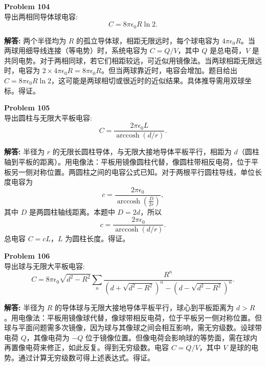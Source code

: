 \documentclass[12pt, a4paper, oneside]{ctexart}
\newenvironment{solution}{\par\noindent\textbf{解答:}\quad}{\par}
\begin{document}
\begin{mdframed}[backgroundcolor=gray!10, linewidth=0pt]
    \textbf{Problem 104} \\
    导出两相同导体球电容:
    \[
    C = 8\pi\epsilon_0 R \ln 2.
    \]
\end{mdframed}
\begin{solution}
    两个半径均为 $R$ 的孤立导体球，相距无限远时，每个球电容为 $4\pi\epsilon_0 R$。当两球用细导线连接（等电势）时，系统电容为 $C = Q/V$，其中 $Q$ 是总电荷，$V$ 是共同电势。对于两相同球，若它们相距较远，可近似用镜像法。当两球相距无限远时，电容为 $2 \times 4\pi\epsilon_0 R = 8\pi\epsilon_0 R$。但当两球靠近时，电容会增加。题目给出 $C = 8\pi\epsilon_0 R \ln 2$，这可能是两球相切或很近时的近似结果。具体推导需用双球坐标。得证。
\end{solution}

\begin{mdframed}[backgroundcolor=gray!10, linewidth=0pt]
    \textbf{Problem 105} \\
    导出圆柱与无限大平板电容:
    \[
    C = \frac{2\pi\epsilon_0 L}{\operatorname{arccosh}(d/r)}.
    \]
\end{mdframed}
\begin{solution}
    半径为 $r$ 的无限长圆柱导体，与无限大接地导体平板平行，相距为 $d$（圆柱轴到平板的距离）。用电像法：平板用镜像圆柱代替，像圆柱带相反电荷，位于平板另一侧对称位置。两圆柱之间的电容公式已知。对于两根平行圆柱导线，单位长度电容为
    \[
    c = \frac{2\pi\epsilon_0}{\operatorname{arccosh}\left( \frac{D}{2r} \right)},
    \]
    其中 $D$ 是两圆柱轴线距离。本题中 $D = 2d$，所以
    \[
    c = \frac{2\pi\epsilon_0}{\operatorname{arccosh}(d/r)}.
    \]
    总电容 $C = c L$，$L$ 为圆柱长度。得证。
\end{solution}

\begin{mdframed}[backgroundcolor=gray!10, linewidth=0pt]
    \textbf{Problem 106} \\
    导出球与无限大平板电容:
    \[
    C = 8\pi\epsilon_0 \sqrt{d^2 - R^2} \sum_n \frac{R^n}{\left(d + \sqrt{d^2 - R^2}\right)^n - \left(d - \sqrt{d^2 - R^2}\right)^n}.
    \]
\end{mdframed}
\begin{solution}
    半径为 $R$ 的导体球与无限大接地导体平板平行，球心到平板距离为 $d > R$。用电像法：平板用镜像球代替，像球带相反电荷，位于平板另一侧对称位置。但球与平面问题需多次镜像，因为球与其像球之间会相互影响，需无穷级数。设球带电荷 $Q$，其像电荷为 $-Q$ 位于镜像位置。但像电荷会影响球的等势面，需在球内再置像电荷来修正，如此反复。得到无穷级数。电容 $C = Q/V$，其中 $V$ 是球的电势。通过计算无穷级数可得上述表达式。得证。
\end{solution}
\end{document}
